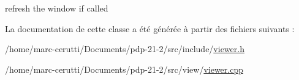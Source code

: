 refresh the window if called 



La documentation de cette classe a été générée à partir des fichiers suivants \+:\begin{DoxyCompactItemize}
\item 
/home/marc-\/cerutti/\+Documents/pdp-\/21-\/2/src/include/\hyperlink{viewer_8h}{viewer.\+h}\item 
/home/marc-\/cerutti/\+Documents/pdp-\/21-\/2/src/view/\hyperlink{viewer_8cpp}{viewer.\+cpp}\end{DoxyCompactItemize}
